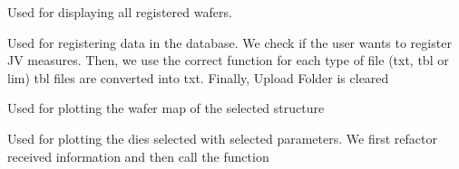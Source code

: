 \documentclass[letterpaper,10pt,english]{sphinxmanual}
\begin{document}

\begin{fulllineitems}
\label{\detokenize{app:app.open}}
\pysigstartsignatures
{}
\pysigstopsignatures
\sphinxAtStartPar
Used for displaying all registered wafers.

\end{fulllineitems}


\begin{fulllineitems}
\label{\detokenize{app:app.options}}
\pysigstartsignatures
{}
\pysigstopsignatures
\sphinxAtStartPar
Used for registering data in the database. We check if the user wants to register J\sphinxhyphen{}V measures.
Then, we use the correct function for each type of file (txt, tbl or lim)
tbl files are converted into txt.
Finally, Upload Folder is cleared

\end{fulllineitems}


\begin{fulllineitems}
\label{\detokenize{app:app.personal_wafer_map}}
\pysigstartsignatures
{}
\pysigstopsignatures
\sphinxAtStartPar
Used for plotting the wafer map of the selected structure

\end{fulllineitems}


\begin{fulllineitems}
\label{\detokenize{app:app.plot_we_want}}
\pysigstartsignatures
{}
\pysigstopsignatures
\sphinxAtStartPar
Used for plotting the dies selected with selected parameters. We first refactor received information and then call the function

\end{fulllineitems}
\end{document}
